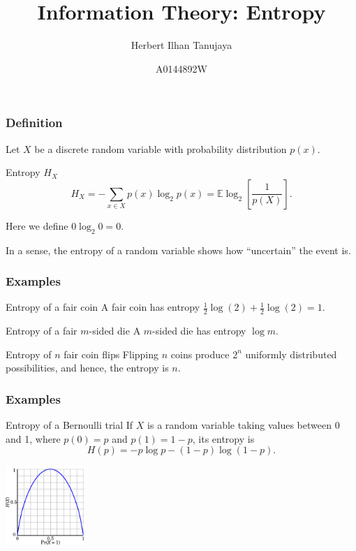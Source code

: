 \documentclass{beamer}
\title{Information Theory: Entropy}
\author{Herbert Ilhan Tanujaya}
\date{A0144892W}
\newcommand{\ls}{\left[}
\newcommand{\rs}{\right]}
\begin{document}
\begin{frame}
  \titlepage
\end{frame}

\begin{frame}
  \frametitle{Definition}
  Let $X$ be a discrete random variable with probability distribution $p(x)$.
  \begin{block}{Entropy $H_X$}
    \[ H_X = - \sum_{x \in X} p(x) \log_2 p(x) = \mathbb{E} \log_2 \ls \frac{1}{p(X)} \rs. \]
  \end{block}
  Here we define $0 \log_2 0 = 0$.

  In a sense, the entropy of a random variable shows how ``uncertain'' the event is.
\end{frame}

\begin{frame}
  \frametitle{Examples}
  \begin{exampleblock}{Entropy of a fair coin}
    A fair coin has entropy $\frac{1}{2} \log(2) + \frac{1}{2} \log(2) = 1$.
  \end{exampleblock} \pause

  \begin{exampleblock}{Entropy of a fair $m$-sided die}
    A $m$-sided die has entropy $\log m$.
  \end{exampleblock} \pause

  \begin{exampleblock}{Entropy of $n$ fair coin flips}
    Flipping $n$ coins produce $2^n$ uniformly distributed possibilities, and hence, the entropy is $n$.
  \end{exampleblock}
\end{frame}

\begin{frame}
  \frametitle{Examples}

  \begin{exampleblock}{Entropy of a Bernoulli trial}
    If $X$ is a random variable taking values between 0 and 1, where $p(0) = p$ and $p(1) = 1 - p$, its entropy is \[ H(p) = -p \log p - (1 - p) \log (1 - p). \]

    \begin{center}
      \includegraphics[width=3cm]{bernoulli.png}
    \end{center}
  \end{exampleblock}
\end{frame}
\end{document}
